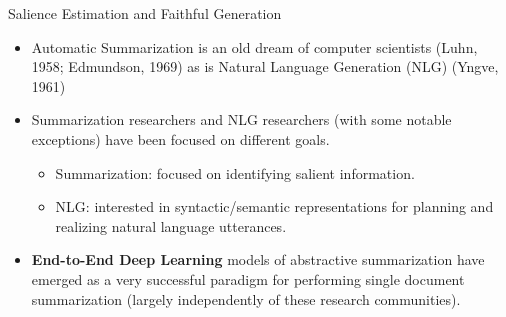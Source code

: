 \begin{frame}{Salience Estimation and Faithful Generation}

\begin{itemize}

    \item Automatic Summarization is an old dream of computer scientists (Luhn, 1958; Edmundson, 1969) as is Natural Language Generation (NLG) (Yngve, 1961)

\vspace{20pt}

\item Summarization researchers and NLG researchers
    (with some notable exceptions) have been focused on different goals.

\begin{itemize}

  \item Summarization: focused on identifying salient information.
  \item NLG: interested in syntactic/semantic representations for
        planning and realizing natural language utterances.

\end{itemize}

\vspace{20pt}

\item \textbf{End-to-End Deep Learning} models of abstractive summarization
    have emerged as a very successful paradigm for performing single document
    summarization (largely independently of these research communities).
        
\end{itemize}
\end{frame}

